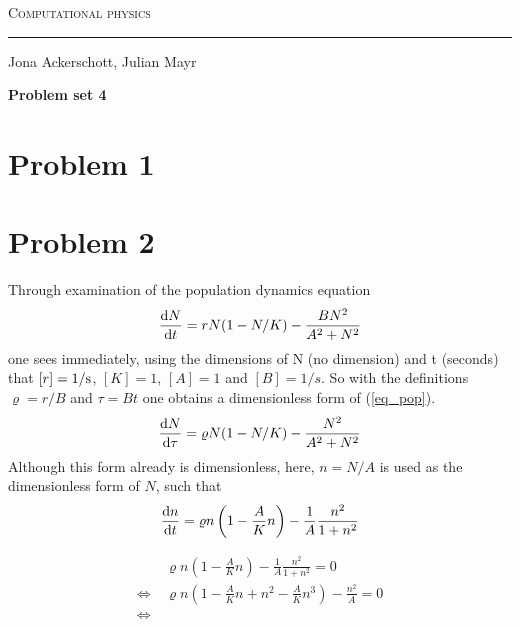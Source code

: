 \documentclass[12pt, a4paper]{article}
\begin{document}
  \centerline{\Huge\scshape Computational physics}
  \vspace*{0.5cm}
  \hrule
  \vspace*{0.5cm}
  \centerline{Jona Ackerschott, Julian Mayr}
  \vspace*{1cm}
  \centerline{\Large\bfseries Problem set 4}
  \vspace*{0.5cm}

  \section*{Problem 1}

  \section*{Problem 2}
  Through examination of the population dynamics equation
  \begin{align}
    \frac{{\rm d} N}{{\rm d} t} = r N (1 - N / K) - \frac{B N^2}{A^2+N^2}
    \label{eq_pop}
  \end{align}
  one sees immediately, using the dimensions of N (no dimension) and t
  (seconds) that $[r] = 1/{\rm s}$, $[K] = 1$, $[A] = 1$ and $[B] = 1/s$.
  So with the definitions $\varrho = r / B$ and $\tau = B t$ one obtains a
  dimensionless form of (\ref{eq_pop}).
  \begin{align}
    \frac{{\rm d} N}{{\rm d} \tau} = \varrho N (1 - N / K)
      - \frac{N^2}{A^2 + N^2}
  \end{align}
  Although this form already is dimensionless, here, $n = N / A$ is used
  as the \glqq dimensionless form\grqq{} of $N$, such that
  \begin{align}
    \frac{{\rm d} n}{{\rm d} t} = \varrho n \left(1 - \frac{A}{K} n\right)
      - \frac{1}{A} \frac{n^2}{1 + n^2}
  \end{align}

  \begin{align}
    & \varrho n \left(1 - \frac{A}{K} n \right)
      - \frac{1}{A} \frac{n^2}{1 + n^2} = 0 \nonumber \\
    \Leftrightarrow \ & \varrho n \left(1 - \frac{A}{K} n + n^2
    - \frac{A}{K} n^3 \right) - \frac{n^2}{A} = 0 \nonumber \\
    \Leftrightarrow \ & 
  \end{align}
\end{document}
